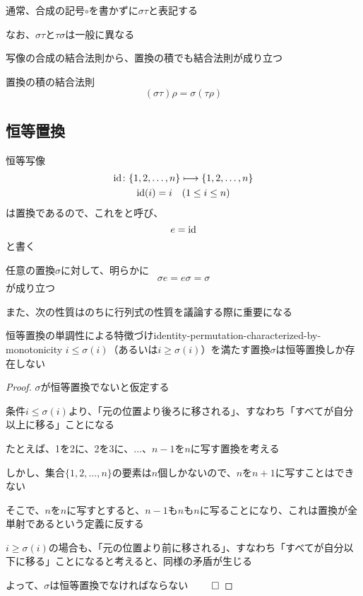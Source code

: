 \documentclass[../../../topic_linear-algebra]{subfiles}
\begin{document}
通常、合成の記号$\circ$を書かずに$\sigma \tau$と表記する

\br

なお、$\sigma\tau$と$\tau\sigma$は一般に異なる

\br

写像の合成の結合法則から、置換の積でも結合法則が成り立つ

\begin{theorem*}{置換の積の結合法則}
  \begin{equation*}
    (\sigma \tau) \rho = \sigma (\tau \rho)
  \end{equation*}
\end{theorem*}

\subsection{恒等置換}

恒等写像
\begin{gather*}
  \operatorname{id}\colon \{ 1,2,\ldots,n \} \longmapsto \{ 1,2,\ldots,n \} \\
  \operatorname{id}(i) = i \quad (1 \leq i \leq n)
\end{gather*}
は置換であるので、これをと呼び、
\begin{equation*}
  e = \operatorname{id}
\end{equation*}
と書く

\br

任意の置換$\sigma$に対して、明らかに
\begin{equation*}
  \sigma e = e \sigma = \sigma
\end{equation*}
が成り立つ

\br

また、次の性質はのちに行列式の性質を議論する際に重要になる

\begin{theorem}{恒等置換の単調性による特徴づけ}{identity-permutation-characterized-by-monotonicity}
  $i \leq \sigma(i)$（あるいは$i \geq \sigma(i)$）を満たす置換$\sigma$は恒等置換しか存在しない
\end{theorem}

\begin{proof}
  $\sigma$が恒等置換でないと仮定する

  条件$i \leq \sigma(i)$より、「元の位置より後ろに移される」、すなわち「すべてが自分以上に移る」ことになる

  たとえば、1を2に、2を3に、$\ldots$、$n-1$を$n$に写す置換を考える

  しかし、集合$\{ 1,2,\ldots,n \}$の要素は$n$個しかないので、$n$を$n+1$に写すことはできない

  そこで、$n$を$n$に写すとすると、$n-1$も$n$も$n$に写ることになり、これは置換が全単射であるという定義に反する

  \br

  $i \geq \sigma(i)$の場合も、「元の位置より前に移される」、すなわち「すべてが自分以下に移る」ことになると考えると、同様の矛盾が生じる

  \br

  よって、$\sigma$は恒等置換でなければならない $\qed$
\end{proof}
\end{document}
